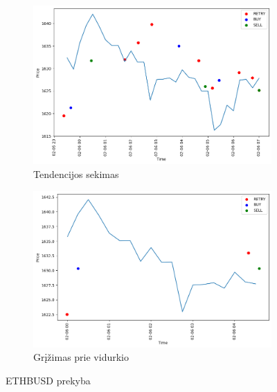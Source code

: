 \documentclass{VUMIFInfKursinis}
\begin{document}
\begin{figure}[H]
  \centering
  \begin{subfigure}{.5\textwidth}
    \centering
    \includegraphics[width=\linewidth]{img/ETHBUSD_ARIMA_trades.png}
    \caption{Tendencijos sekimas}
    \label{fig:ethbusd_arima_trades}
  \end{subfigure}%
  \begin{subfigure}{.5\textwidth}
    \centering
    \includegraphics[width=\linewidth]{img/ETHBUSD_SMA_trades.png}
    \caption{Grįžimas prie vidurkio}
    \label{fig:ethbusd_sma_trades}
  \end{subfigure}
  \caption{ETHBUSD prekyba}
  \label{fig:ethbusd_trades}
\end{figure}
\end{document}

